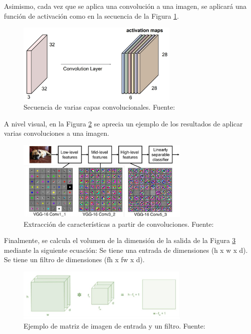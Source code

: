 \begin{itemize}
\begin{itemize}
\begin{itemize}
			Asimismo, cada vez que se aplica una convolución a una imagen, se aplicará una función de activación como en la secuencia de la Figura \ref{2:fig28}.
			\begin{figure}[h]
				\begin{center}
					\includegraphics[width=0.7\textwidth]{2/figures/filtros_cnn.jpg}
					\caption{Secuencia de varias capas convolucionales. Fuente: \cite{tec_li2019cnn}}
					\label{2:fig28}
				\end{center}
			\end{figure}
			
			A nivel visual, en la Figura \ref{2:fig29} se aprecia un ejemplo de los resultados de aplicar varias convoluciones a una imagen.
			\begin{figure}[h]
				\begin{center}
					\includegraphics[width=0.75\textwidth]{2/figures/features_cnn.jpg}
					\caption{Extracción de características a partir de convoluciones. Fuente: \cite{tec_li2019cnn}}
					\label{2:fig29}
				\end{center}
			\end{figure}
			
			Finalmente, se calcula el volumen de la dimensión de la salida de la Figura \ref{2:fig30} mediante la siguiente ecuación:
			Se tiene una entrada de dimensiones (h x w x d).
			Se tiene un filtro de dimensiones (fh  x fw  x d).
			\begin{figure}[h]
				\begin{center}
					\includegraphics[width=0.75\textwidth]{2/figures/matriz_cnn.jpg}
					\caption{Ejemplo de matriz de imagen de entrada y un filtro. Fuente: \cite{tec_prabhu2018cnn}}
					\label{2:fig30}
				\end{center}
			\end{figure}
			

\end{itemize}
\end{itemize}
\end{itemize}
